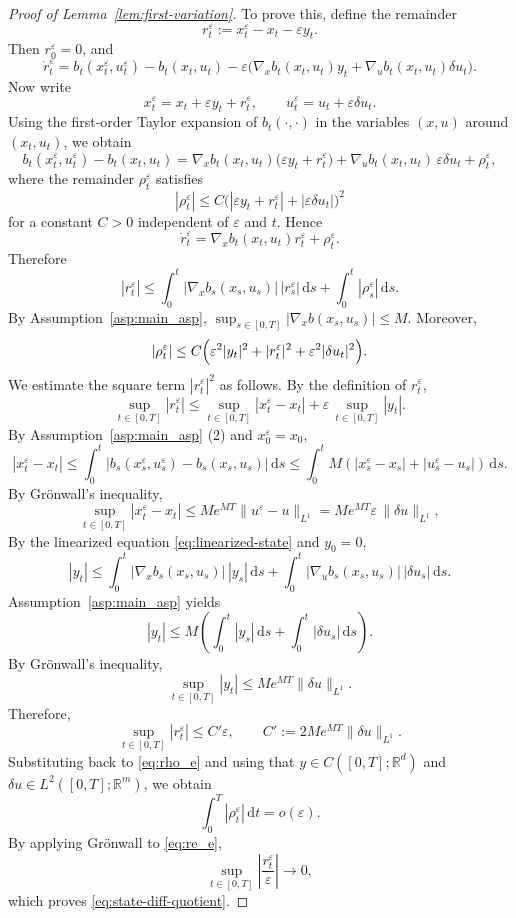 \documentclass[10pt,a4paper]{amsart}
\newcommand{\dd}{\,\mathrm{d}}
\begin{document}
\begin{proof}[Proof of Lemma~\ref{lem:first-variation}]
To prove this, define the remainder
\[
r_t^\varepsilon
:=
x_t^\varepsilon-x_t-\varepsilon y_t.
\]
Then $r_0^\varepsilon=0$, and
\[
\dot r_t^\varepsilon
=
b_t(x_t^\varepsilon,u_t^\varepsilon)-b_t(x_t,u_t)
-
\varepsilon\Big(
\nabla_x b_t(x_t,u_t)y_t+\nabla_u b_t(x_t,u_t)\delta u_t
\Big).
\]
Now write
\[
x_t^\varepsilon=x_t+\varepsilon y_t+r_t^\varepsilon,
\qquad
u_t^\varepsilon=u_t+\varepsilon\delta u_t.
\]
Using the first-order Taylor expansion of $b_t(\cdot,\cdot)$ in the variables $(x,u)$
around $(x_t,u_t)$, we obtain
\[
b_t(x_t^\varepsilon,u_t^\varepsilon)-b_t(x_t,u_t)
=
\nabla_x b_t(x_t,u_t)\bigl(\varepsilon y_t+r_t^\varepsilon\bigr)
+
\nabla_u b_t(x_t,u_t)\,\varepsilon\delta u_t
+
\rho_t^\varepsilon,
\]
where the remainder $\rho_t^\varepsilon$ satisfies
\[
|\rho_t^\varepsilon|
\le
C\Big(|\varepsilon y_t+r_t^\varepsilon|+|\varepsilon\delta u_t|\Big)^2
\]
for a constant $C>0$ independent of $\varepsilon$ and $t$.
Hence
\[
\dot r_t^\varepsilon
=
\nabla_x b_t(x_t,u_t) r_t^\varepsilon + \rho_t^\varepsilon.
\]
Therefore
\begin{equation}\label{eq:re_e}
    |r_t^\varepsilon|
\le
\int_0^t |\nabla_x b_s(x_s,u_s)|\,|r_s^\varepsilon|\dd s
+
\int_0^t |\rho_s^\varepsilon|\dd s.
\end{equation}
By Assumption~\ref{asp:main_asp}, $\sup_{s \in [0,T]} |\nabla_x b(x_s, u_s)|\leq M$.
Moreover,
\begin{equation}\label{eq:rho_e}
    |\rho_t^\varepsilon|
\le
C\Bigl(\varepsilon^2|y_t|^2+|r_t^\varepsilon|^2+\varepsilon^2|\delta u_t|^2\Bigr).
\end{equation}
We estimate the square term $|r_t^{\varepsilon}|^2$ as follows. By the definition of $r_t^{\varepsilon}$,
\[
\sup_{t\in[0,T]} |r_t^\varepsilon|
\le
\sup_{t\in[0,T]} |x_t^\varepsilon-x_t|
+
\varepsilon\,\sup_{t\in[0,T]} |y_t|.
\]
By Assumption~\ref{asp:main_asp} (2) and $x_0^{\varepsilon} = x_0$,
\[
|x_t^\varepsilon - x_t| \leq \int_0^t |b_s(x_s^\varepsilon, u_s^\varepsilon) - b_s(x_s, u_s)| \dd s \leq \int_0^t M \left( |x_s^\varepsilon - x_s| + |u_s^\varepsilon - u_s| \right) \dd s.
\]
By Gr\"onwall's inequality,
\[
\sup_{t\in[0,T]} |x_t^\varepsilon-x_t|
\le
M e^{MT} \|u^\varepsilon-u\|_{L^1}
=
M e^{MT} \varepsilon\,\|\delta u\|_{L^1},
\]
By the linearized equation \eqref{eq:linearized-state} and $y_0 = 0$,
\[
|y_t| \leq \int_0^t |\nabla_x b_s(x_s, u_s)|\,|y_s|\dd s + \int_0^t |\nabla_u b_s(x_s, u_s)| \, |\delta u_s| \dd s.
\]
Assumption~\ref{asp:main_asp} yields
\[
|y_t| \leq M \left( \int_0^t |y_s| \dd s + \int_0^t |\delta u_s| \dd s \right).
\]
By Gr\"onwall's inequality,
\[
\sup_{t \in [0,T]} |y_t| \leq M e^{MT}\|\delta u\|_{L^1}.
\]
Therefore,
\[
\sup_{t\in[0,T]} |r_t^\varepsilon|
\le
C' \varepsilon, \qquad C':= 2 Me^{MT} \|\delta u\|_{L^1}.
\]
Substituting back to \eqref{eq:rho_e} and
using that $y\in C([0,T];\mathbb R^d)$ and $\delta u\in L^2([0,T];\mathbb R^m)$, we obtain
\[
\int_0^T |\rho_t^\varepsilon| \dd t = o(\varepsilon).
\]
By applying Gr\"onwall to \eqref{eq:re_e},
\[
\sup_{t\in[0,T]} \left|\frac{r_t^\varepsilon}{\varepsilon}\right|\to 0,
\]
which proves \eqref{eq:state-diff-quotient}.


\end{proof}
\end{document}
